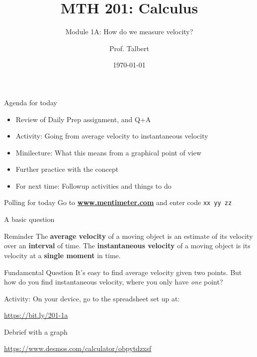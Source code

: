 \documentclass{beamer}
\title{MTH 201: Calculus}
\subtitle{Module 1A: How do we measure velocity?}
\author{Prof. Talbert}
\institute{GVSU}
\date{\today}
\begin{document}
\frame{\titlepage}


\begin{frame}{Agenda for today}
    \begin{itemize}
        \item<1-> Review of Daily Prep assignment, and Q+A
        \item<2-> Activity: Going from average velocity to instantaneous velocity
        \item<3-> Minilecture: What this means from a graphical point of view 
        \item<4-> Further practice with the concept
        \item<5-> For next time: Followup activities and things to do 
    \end{itemize}
\end{frame}

\begin{frame}{Polling for today}
    \large{
    Go to \textbf{\url{www.mentimeter.com}} and enter code \texttt{xx yy zz} 
    }
    \end{frame}

\begin{frame}{A basic question}
    
    \begin{block}{Reminder}
        The \textbf{average velocity} of a moving object is an estimate of its velocity over an \textbf{interval} of time. The \textbf{instantaneous velocity} of a moving object is its velocity at a \textbf{single moment} in time. 
    \end{block}
    
    \begin{alertblock}{Fundamental Question}
        It's easy to find average velocity given two points. But how do you find instantaneous velocity, where you only have \emph{one} point? 
    \end{alertblock}
    
    Activity: On your device, go to the spreadsheet set up at: 
    
    \begin{center}
        \url{https://bit.ly/201-1a}
    \end{center}
    
    \end{frame}
    
\begin{frame}{Debrief with a graph}
     \begin{center}
        \url{https://www.desmos.com/calculator/obpytdzxsf}
    \end{center}
\end{frame}
\end{document}
